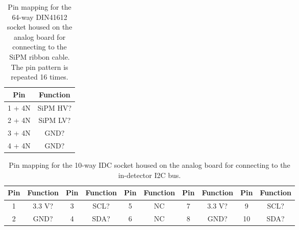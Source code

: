 \documentclass[a4paper]{article}
\begin{document}
\begin{table}[h]
    \begin{center}
        \caption{Pin mapping for the 64-way DIN41612 socket housed on the analog board for connecting to the SiPM ribbon cable. The pin pattern is repeated 16 times.}
        \label{tab:IDC64way}
        \begin{tabular}{cc}
            \hline
            \hline
            Pin & Function \\
            \hline
            1 + 4N & SiPM HV? \\
            2 + 4N & SiPM LV? \\
            3 + 4N & GND? \\
            4 + 4N & GND? \\
            \hline
            \hline
        \end{tabular}
    \end{center}
\end{table}

\begin{table}[h]
    \begin{center}
        \caption{Pin mapping for the 10-way IDC socket housed on the analog board for connecting to the in-detector I2C bus.}
        \label{tab:IDC10way}
        \begin{tabular}{cc|cc|cc|cc|cc}
            \hline
            \hline
            Pin & Function & Pin & Function & Pin & Function & Pin & Function & Pin & Function \\
            \hline
            1 & 3.3 V? & 3 & SCL? & 5 & NC & 7 & 3.3 V? & 9 & SCL? \\
            2 & GND? & 4 & SDA? & 6 & NC & 8 & GND? & 10 & SDA? \\
            \hline
            \hline
        \end{tabular}
    \end{center}
\end{table}
\end{document}

